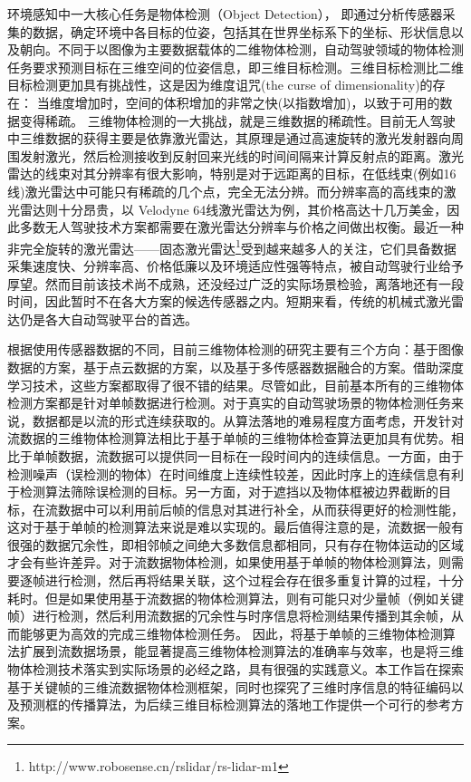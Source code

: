 

环境感知中一大核心任务是物体检测（Object Detection）， 即通过分析传感器采集的数据，确定环境中各目标的位姿，包括其在世界坐标系下的坐标、形状信息以及朝向。不同于以图像为主要数据载体的二维物体检测，自动驾驶领域的物体检测任务要求预测目标在三维空间的位姿信息，即三维目标检测。三维目标检测比二维目标检测更加具有挑战性，这是因为维度诅咒(the curse of dimensionality)的存在： 当维度增加时，空间的体积增加的非常之快(以指数增加)，以致于可用的数据变得稀疏。 三维物体检测的一大挑战，就是三维数据的稀疏性。目前无人驾驶中三维数据的获得主要是依靠激光雷达，其原理是通过高速旋转的激光发射器向周围发射激光，然后检测接收到反射回来光线的时间间隔来计算反射点的距离。激光雷达的线束对其分辨率有很大影响，特别是对于远距离的目标，在低线束(例如16线)激光雷达中可能只有稀疏的几个点，完全无法分辨。而分辨率高的高线束的激光雷达则十分昂贵，以 Velodyne 64线激光雷达为例，其价格高达十几万美金，因此多数无人驾驶技术方案都需要在激光雷达分辨率与价格之间做出权衡。最近一种非完全旋转的激光雷达——固态激光雷达\footnote[3]{http://www.robosense.cn/rslidar/rs-lidar-m1}受到越来越多人的关注，它们具备数据采集速度快、分辨率高、价格低廉以及环境适应性强等特点，被自动驾驶行业给予厚望。然而目前该技术尚不成熟，还没经过广泛的实际场景检验，离落地还有一段时间，因此暂时不在各大方案的候选传感器之内。短期来看，传统的机械式激光雷达仍是各大自动驾驶平台的首选。

根据使用传感器数据的不同，目前三维物体检测的研究主要有三个方向：基于图像数据的方案\cite{7780605, chen20183d}，基于点云数据的方案\cite{li20173d,engelcke2017vote3deep,zhou2018voxelnet,simon2018complex,shi2019pointrcnn}，以及基于多传感器数据融合的方案\cite{qi2018frustum,chen2017multi,ku2018joint}。借助深度学习技术，这些方案都取得了很不错的结果。尽管如此，目前基本所有的三维物体检测方案都是针对单帧数据进行检测。对于真实的自动驾驶场景的物体检测任务来说，数据都是以流的形式连续获取的。从算法落地的难易程度方面考虑，开发针对流数据的三维物体检测算法相比于基于单帧的三维物体检查算法更加具有优势。相比于单帧数据，流数据可以提供同一目标在一段时间内的连续信息。一方面，由于检测噪声（误检测的物体）在时间维度上连续性较差，因此时序上的连续信息有利于检测算法筛除误检测的目标。另一方面，对于遮挡以及物体框被边界截断的目标，在流数据中可以利用前后帧的信息对其进行补全，从而获得更好的检测性能，这对于基于单帧的检测算法来说是难以实现的。最后值得注意的是，流数据一般有很强的数据冗余性，即相邻帧之间绝大多数信息都相同，只有存在物体运动的区域才会有些许差异。对于流数据物体检测，如果使用基于单帧的物体检测算法，则需要逐帧进行检测，然后再将结果关联，这个过程会存在很多重复计算的过程，十分耗时。但是如果使用基于流数据的物体检测算法，则有可能只对少量帧（例如关键帧）进行检测，然后利用流数据的冗余性与时序信息将检测结果传播到其余帧，从而能够更为高效的完成三维物体检测任务。 因此，将基于单帧的三维物体检测算法扩展到流数据场景，能显著提高三维物体检测算法的准确率与效率，也是将三维物体检测技术落实到实际场景的必经之路，具有很强的实践意义。本工作旨在探索基于关键帧的三维流数据物体检测框架，同时也探究了三维时序信息的特征编码以及预测框的传播算法，为后续三维目标检测算法的落地工作提供一个可行的参考方案。

